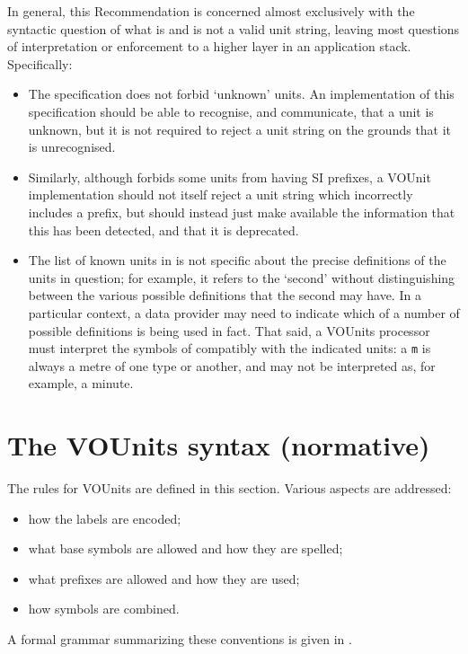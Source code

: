 \documentclass[11pt,notitlepage,onecolumn]{ivoa}
\newcommand{\unit}[1]{\texttt{\small\color{orange}#1}}
\begin{document}
In general, this Recommendation is concerned almost exclusively with
the syntactic question of what is and is not a valid unit string,
leaving most questions of interpretation or enforcement to a higher layer in an
application stack.  Specifically:
\begin{itemize}
\item The specification does not forbid `unknown' units.  An
implementation of this specification should be able to recognise, and
communicate, that a unit is unknown, but it is not required to reject
a unit string on the grounds that it is unrecognised.

\item Similarly, although  forbids some
units from having SI prefixes, a VOUnit implementation should not
itself reject a unit string which incorrectly includes a prefix, but
should instead just make available the information that this has been
detected, and that it is deprecated.

\item The list of known units in  is not
specific about the precise definitions of the units in question; for
example, it refers to the `second' without distinguishing between the
various possible definitions that the second may have.  In a
particular context, a data provider may need to indicate which of a
number of possible definitions is being used in fact.  That said, a
VOUnits processor must interpret the symbols
of  compatibly with the indicated units:
a \unit{m} is always a metre of one type or another, and may not be
interpreted as, for example, a minute.
\end{itemize}

\section{The VOUnits syntax (normative)\label{sec:proposal}}

The rules for VOUnits are defined in this section.
Various aspects are addressed:
\begin{itemize}
\item how the labels are encoded;
\item what base symbols are allowed and how they are spelled;
\item what prefixes are allowed and how they are used;
\item how symbols are combined.
\end{itemize}
A formal grammar summarizing these conventions is given
in .
\end{document}
